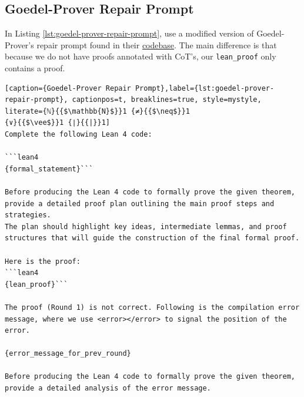 \subsection{Goedel-Prover Repair Prompt}

In Listing \ref{lst:goedel-prover-repair-prompt}, use a modified version of Goedel-Prover's repair prompt found in their \href{https://github.com/Goedel-LM/Goedel-Prover-V2}{codebase}. 
The main difference is that because we do not have proofs annotated with CoT's, our \texttt{lean\_proof} only contains a proof. 

\begin{lstlisting}[caption={Goedel-Prover Repair Prompt},label={lst:goedel-prover-repair-prompt}, captionpos=t, breaklines=true, style=mystyle, literate={ℕ}{{$\mathbb{N}$}}1 {≠}{{$\neq$}}1
{∨}{{$\vee$}}1 {∣}{{|}}1]
Complete the following Lean 4 code:

```lean4
{formal_statement}```

Before producing the Lean 4 code to formally prove the given theorem, provide a detailed proof plan outlining the main proof steps and strategies.
The plan should highlight key ideas, intermediate lemmas, and proof structures that will guide the construction of the final formal proof.

Here is the proof:
```lean4
{lean_proof}```

The proof (Round 1) is not correct. Following is the compilation error message, where we use <error></error> to signal the position of the error.

{error_message_for_prev_round}

Before producing the Lean 4 code to formally prove the given theorem, provide a detailed analysis of the error message.
\end{lstlisting}
